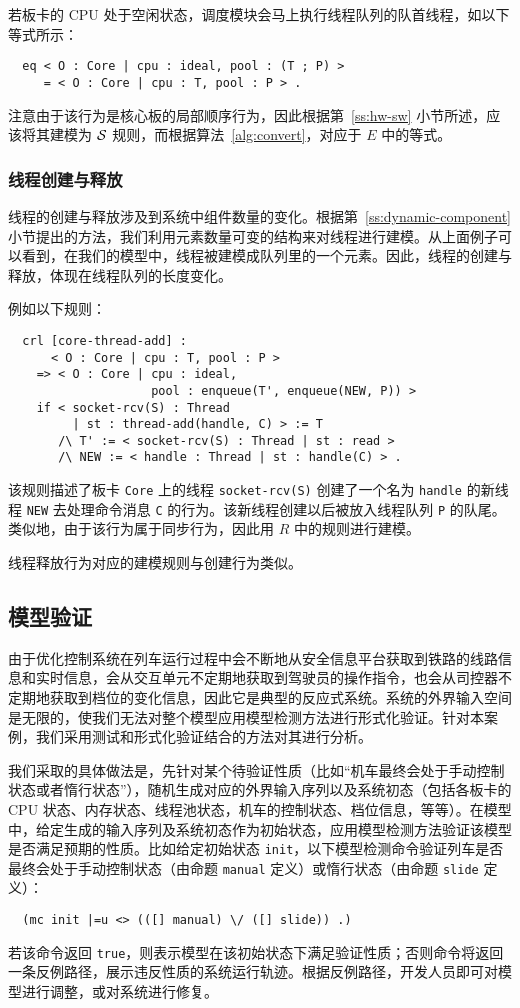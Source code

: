 若板卡的 CPU 处于空闲状态，调度模块会马上执行线程队列的队首线程，如以下等式所示：
\begin{verbatim}
  eq < O : Core | cpu : ideal, pool : (T ; P) > 
     = < O : Core | cpu : T, pool : P > .
\end{verbatim}
注意由于该行为是核心板的局部顺序行为，因此根据第~\ref{ss:hw-sw} 小节所述，应该将其建模为 $\mathcal{S}$ 规则，而根据算法~\ref{alg:convert}，对应于 $E$ 中的等式。


\subsubsection{线程创建与释放}

线程的创建与释放涉及到系统中组件数量的变化。根据第~\ref{ss:dynamic-component} 小节提出的方法，我们利用元素数量可变的结构来对线程进行建模。从上面例子可以看到，在我们的模型中，线程被建模成队列里的一个元素。因此，线程的创建与释放，体现在线程队列的长度变化。

例如以下规则：
\begin{verbatim}
  crl [core-thread-add] :
      < O : Core | cpu : T, pool : P >
    => < O : Core | cpu : ideal, 
                    pool : enqueue(T', enqueue(NEW, P)) >
    if < socket-rcv(S) : Thread 
         | st : thread-add(handle, C) > := T
       /\ T' := < socket-rcv(S) : Thread | st : read >
       /\ NEW := < handle : Thread | st : handle(C) > . 
\end{verbatim}
该规则描述了板卡 \verb|Core| 上的线程 \verb|socket-rcv(S)| 创建了一个名为 \verb|handle| 的新线程 \verb|NEW| 去处理命令消息 \verb|C| 的行为。该新线程创建以后被放入线程队列 \verb|P| 的队尾。类似地，由于该行为属于同步行为，因此用 $R$ 中的规则进行建模。

线程释放行为对应的建模规则与创建行为类似。

\subsection{模型验证}

由于优化控制系统在列车运行过程中会不断地从安全信息平台获取到铁路的线路信息和实时信息，会从交互单元不定期地获取到驾驶员的操作指令，也会从司控器不定期地获取到档位的变化信息，因此它是典型的反应式系统。系统的外界输入空间是无限的，使我们无法对整个模型应用模型检测方法进行形式化验证。针对本案例，我们采用测试和形式化验证结合的方法对其进行分析。

我们采取的具体做法是，先针对某个待验证性质（比如“机车最终会处于手动控制状态或者惰行状态”），随机生成对应的外界输入序列以及系统初态（包括各板卡的 CPU 状态、内存状态、线程池状态，机车的控制状态、档位信息，等等）。在模型中，给定生成的输入序列及系统初态作为初始状态，应用模型检测方法验证该模型是否满足预期的性质。比如给定初始状态 \verb|init|，以下模型检测命令验证列车是否最终会处于手动控制状态（由命题 \verb|manual| 定义）或惰行状态（由命题 \verb|slide| 定义）：
\begin{verbatim}
  (mc init |=u <> (([] manual) \/ ([] slide)) .)
\end{verbatim}
若该命令返回 \verb|true|，则表示模型在该初始状态下满足验证性质；否则命令将返回一条反例路径，展示违反性质的系统运行轨迹。根据反例路径，开发人员即可对模型进行调整，或对系统进行修复。


